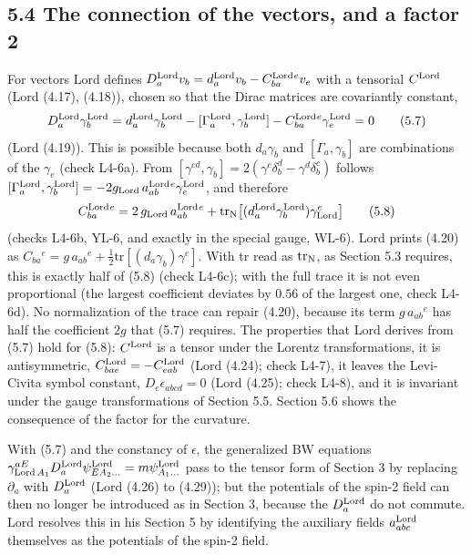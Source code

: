 \documentclass[
  10pt,
]{article}
\begin{document}
\hypertarget{the-connection-of-the-vectors-and-a-factor-2}{%
\subsection{5.4 The connection of the vectors, and a factor
2}\label{the-connection-of-the-vectors-and-a-factor-2}}

For vectors Lord defines
\(D^{\rm Lord}_av_b=d^{\rm Lord}_av_b-C^{\rm Lord}_{ba}{}^e v_e\) with a
tensorial \(C^{\rm Lord}\) (Lord (4.17), (4.18)), chosen so that the
Dirac matrices are covariantly constant,
\[D^{\rm Lord}_a\gamma^{\rm Lord}_b=d^{\rm Lord}_a\gamma^{\rm Lord}_b-[\Gamma^{\rm Lord}_a,\gamma^{\rm Lord}_b]-C^{\rm Lord}_{ba}{}^e\gamma^{\rm Lord}_e=0\tag{5.7}\]
(Lord (4.19)). This is possible because both \(d_a\gamma_b\) and
\([\Gamma_a,\gamma_b]\) are combinations of the \(\gamma_e\) (check
L4-6a). From
\([\gamma^{cd},\gamma_b]=2(\gamma^c\delta^d_b-\gamma^d\delta^c_b)\)
follows
\([\Gamma^{\rm Lord}_a,\gamma^{\rm Lord}_b]=-2g_{\rm Lord}\,a^{\rm Lord}_{ab}{}^e\gamma^{\rm Lord}_e\),
and therefore
\[C^{\rm Lord}_{ba}{}^e=2\,g_{\rm Lord}\,a^{\rm Lord}_{ab}{}^e+\mathrm{tr}_{\rm N}\big[(d^{\rm Lord}_a\gamma^{\rm Lord}_b)\gamma^e_{\rm Lord}\big]\tag{5.8}\]
(checks L4-6b, YL-6, and exactly in the special gauge, WL-6). Lord
prints (4.20) as
\(C_{ba}{}^e=g\,a_{ab}{}^e+\tfrac12\mathrm{tr}[(d_a\gamma_b)\gamma^e]\).
With tr read as \(\mathrm{tr}_{\rm N}\), as Section 5.3 requires, this
is exactly half of (5.8) (check L4-6c); with the full trace it is not
even proportional (the largest coefficient deviates by \(0.56\) of the
largest one, check L4-6d). No normalization of the trace can repair
(4.20), because its term \(g\,a_{ab}{}^e\) has half the coefficient
\(2g\) that (5.7) requires. The properties that Lord derives from (5.7)
hold for (5.8): \(C^{\rm Lord}\) is a tensor under the Lorentz
transformations, it is antisymmetric,
\(C^{\rm Lord}_{bae}=-C^{\rm Lord}_{eab}\) (Lord (4.24); check L4-7), it
leaves the Levi-Civita symbol constant, \(D_e\epsilon_{abcd}=0\) (Lord
(4.25); check L4-8), and it is invariant under the gauge transformations
of Section 5.5. Section 5.6 shows the consequence of the factor for the
curvature.

With (5.7) and the constancy of \(\epsilon\), the generalized BW
equations
\(\gamma^{aE}_{{\rm Lord}\,A_1}D^{\rm Lord}_a\psi^{\rm Lord}_{EA_2\dots}=m\psi^{\rm Lord}_{A_1\dots}\)
pass to the tensor form of Section 3 by replacing \(\partial_a\) with
\(D^{\rm Lord}_a\) (Lord (4.26) to (4.29)); but the potentials of the
spin-2 field can then no longer be introduced as in Section 3, because
the \(D^{\rm Lord}_a\) do not commute. Lord resolves this in his Section
5 by identifying the auxiliary fields \(a^{\rm Lord}_{abc}\) themselves
as the potentials of the spin-2 field.
\end{document}
